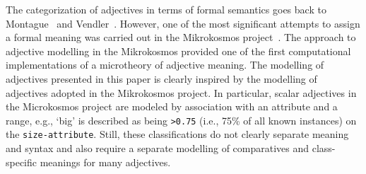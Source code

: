 \documentclass[11pt]{article}
\begin{document}
The categorization of adjectives in terms of formal semantics goes back to Montague~ and Vendler~. However, one of the most significant attempts to assign a formal meaning was carried out in the Mikrokosmos project~\cite{raskin1995lexical}. The approach to adjective modelling in the Mikrokosmos provided one of the first computational implementations of a microtheory of adjective meaning. The modelling of adjectives presented in this paper is clearly inspired by the modelling of adjectives adopted in the Mikrokosmos project. In particular, scalar adjectives in the Microkosmos project are modeled by association with an attribute and a range, e.g., `big' is described as being {\tt >0.75} (i.e., 75\% of all known instances) on the {\tt size-attribute}. Still, these classifications do not clearly separate meaning and syntax and also require a separate modelling of comparatives and class-specific meanings for many adjectives.
\end{document}
